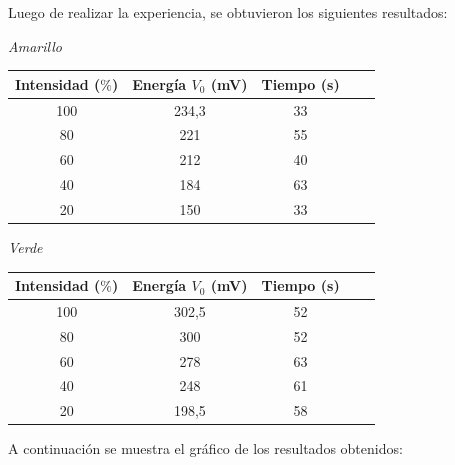\documentclass[a4paper]{article}
\begin{document}
        \indent Luego de realizar la experiencia, se obtuvieron los siguientes resultados:

        \begin{minipage}[c]{7.5cm}
          \vspace{2mm}
          \centering
          \textit{Amarillo} 
          \vspace{1mm}
        \end{minipage}
        
      \begin{center}
        \begin{tabular}{ c c c c c }
            \toprule
            Intensidad ($\%$) & Energía $V_{0}$ (mV) & Tiempo (s) \\
              \midrule
              100 & 234,3 & 33\\
              80 & 221 & 55\\
              60 & 212 & 40\\
              40 & 184 & 63\\
              20 & 150 & 33\\
            \bottomrule
          \end{tabular}
        \end{center}

          \begin{minipage}[c]{7.5cm}
            \vspace{5mm}
            \centering
            \textit{Verde} 
            \vspace{1mm}
          \end{minipage}

        \begin{center}
          \begin{tabular}{ c c c c c }
            \toprule
            Intensidad ($\%$) & Energía $V_{0}$ (mV) & Tiempo (s) \\
              \midrule
              100 & 302,5 &    52   \\
              80 & 300    &    52   \\
              60 & 278    &    63   \\
              40 & 248    &    61   \\
              20 & 198,5  &    58   \\
            \bottomrule
          \end{tabular}
        \end{center}

        \indent A continuación se muestra el gráfico de los resultados obtenidos:
\end{document}
